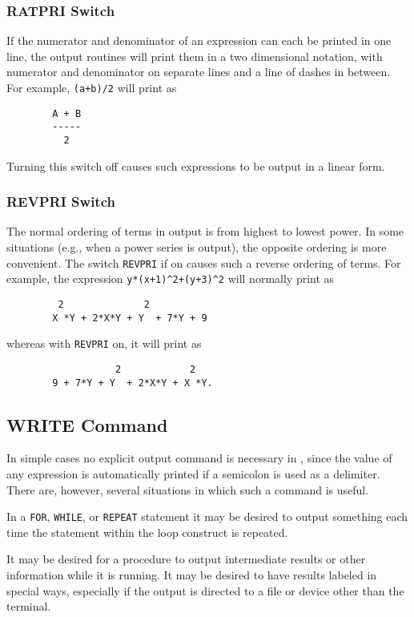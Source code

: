 \subsubsection{RATPRI Switch}

If the numerator and denominator of an expression can each be printed in
one line, the output routines will print them in a two dimensional
notation, with numerator and denominator on separate lines and a line of
dashes in between. For example, {\tt (a+b)/2} will print as
\begin{verbatim}
        A + B
        -----
          2
\end{verbatim}
Turning this switch off causes such expressions to be output in a linear
form.

\subsubsection{REVPRI Switch}

The normal ordering of terms in output is from highest to lowest power.
In some situations (e.g., when a power series is output), the opposite
ordering is more convenient.  The switch {\tt REVPRI} if on causes such a
reverse ordering of terms.  For example, the expression
{\tt y*(x+1)\^{ }2+(y+3)\^{ }2} will normally print as
\begin{verbatim}
         2              2
        X *Y + 2*X*Y + Y  + 7*Y + 9
\end{verbatim}
whereas with {\tt REVPRI} on, it will print as
\begin{verbatim}
                   2            2
        9 + 7*Y + Y  + 2*X*Y + X *Y.
\end{verbatim}

\subsection{WRITE Command} 

In simple cases no explicit output command is necessary in
{\REDUCE}, since the value of any expression is automatically printed if a
semicolon is used as a delimiter.  There are, however, several situations
in which such a command is useful.

In a {\tt FOR}, {\tt WHILE}, or {\tt REPEAT} statement it may be desired
to output something each time the statement within the loop construct is
repeated.

It may be desired for a procedure to output intermediate results or other
information while it is running. It may be desired to have results labeled
in special ways, especially if the output is directed to a file or device
other than the terminal.

